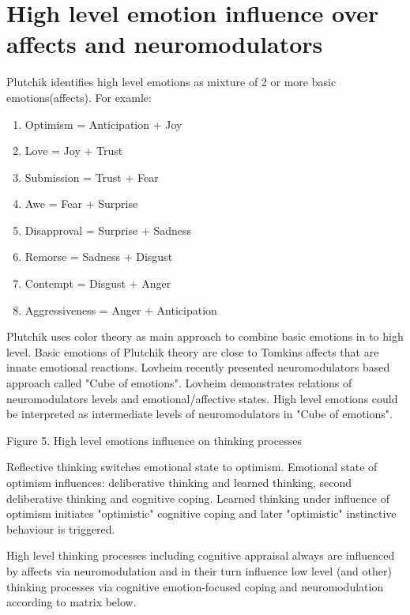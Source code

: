 \section{High level emotion influence over affects and neuromodulators}

Plutchik identifies high level emotions \cite{natureofemotions} as mixture of 2 or more basic emotions(affects). For examle:

\begin{enumerate}
 \item  Optimism =	Anticipation + Joy
 \item  Love =	Joy + Trust
 \item  Submission = Trust + Fear
 \item  Awe = Fear + Surprise
 \item  Disapproval = Surprise + Sadness
 \item  Remorse = Sadness + Disgust
 \item  Contempt = Disgust + Anger
 \item  Aggressiveness =	Anger + Anticipation
\end{enumerate}

Plutchik uses color theory as main approach to combine basic emotions in to high level. Basic emotions of Plutchik theory are close to Tomkins affects that are innate emotional reactions. Lovheim recently presented neuromodulators based approach called "Cube of emotions"\cite{cubeofemotions}. Lovheim demonstrates relations of neuromodulators levels and emotional/affective states. High level emotions could be interpreted as intermediate levels of neuromodulators in "Cube of emotions"\cite{cubeofemotions}.

\begin{center}
Figure 5. High level emotions influence on thinking processes
\end{center}

Reflective thinking switches emotional state to optimism. Emotional state of optimism influences: deliberative thinking and learned thinking, second deliberative thinking and cognitive coping. Learned thinking under influence of optimism initiates "optimistic" cognitive coping and later "optimistic" instinctive behaviour is triggered.

High level thinking processes including cognitive appraisal always are influenced by affects via neuromodulation and in their turn influence low level (and other) thinking processes via cognitive emotion-focused coping and neuromodulation according to matrix below.

